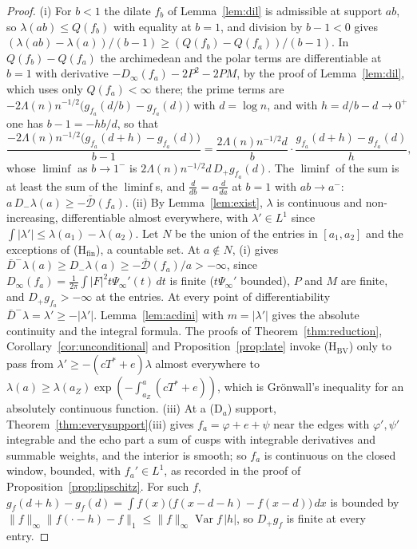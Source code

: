 \documentclass[11pt]{article}
\theoremstyle{definition}
\theoremstyle{remark}
\newcommand{\Tst}{T^{*}}
\newcommand{\Dm}{D_{-}}
\begin{document}
\begin{proof}
(i) For $b<1$ the dilate $f_b$ of Lemma~\ref{lem:dil} is admissible at support $ab$, so $\lambda(ab)\le Q(f_b)$ with equality at $b=1$, and division by $b-1<0$ gives $(\lambda(ab)-\lambda(a))/(b-1)\ge(Q(f_b)-Q(f_a))/(b-1)$. In $Q(f_b)-Q(f_a)$ the archimedean and the polar terms are differentiable at $b=1$ with derivative $-D_\infty(f_a)-2P^2-2PM$, by the proof of Lemma~\ref{lem:dil}, which uses only $Q(f_a)<\infty$ there; the prime terms are $-2\Lambda(n)n^{-1/2}\big(g_{f_a}(d/b)-g_{f_a}(d)\big)$ with $d=\log n$, and with $h=d/b-d\to0^+$ one has $b-1=-hb/d$, so that
\[
\frac{-2\Lambda(n)n^{-1/2}\big(g_{f_a}(d+h)-g_{f_a}(d)\big)}{b-1}=\frac{2\Lambda(n)n^{-1/2}d}{b}\cdot\frac{g_{f_a}(d+h)-g_{f_a}(d)}{h},
\]
whose $\liminf$ as $b\to1^-$ is $2\Lambda(n)n^{-1/2}d\,D_+g_{f_a}(d)$. The $\liminf$ of the sum is at least the sum of the $\liminf$s, and $\frac d{db}=a\frac d{da}$ at $b=1$ with $ab\to a^-$: $a\,\Dm\lambda(a)\ge-\bar{\mathcal D}(f_a)$. (ii) By Lemma~\ref{lem:exist}, $\lambda$ is continuous and non-increasing, differentiable almost everywhere, with $\lambda'\in L^1$ since $\int|\lambda'|\le\lambda(a_1)-\lambda(a_2)$. Let $N$ be the union of the entries in $[a_1,a_2]$ and the exceptions of (H$_{\mathrm{fin}}$), a countable set. At $a\notin N$, (i) gives $\bar D^-\lambda(a)\ge\Dm\lambda(a)\ge-\bar{\mathcal D}(f_a)/a>-\infty$, since $D_\infty(f_a)=\frac1{2\pi}\int|F|^2t\Psi_\infty'(t)\,dt$ is finite ($t\Psi_\infty'$ bounded), $P$ and $M$ are finite, and $D_+g_{f_a}>-\infty$ at the entries. At every point of differentiability $\bar D^-\lambda=\lambda'\ge-|\lambda'|$. Lemma~\ref{lem:acdini} with $m=|\lambda'|$ gives the absolute continuity and the integral formula. The proofs of Theorem~\ref{thm:reduction}, Corollary~\ref{cor:unconditional} and Proposition~\ref{prop:late} invoke (H$_{\mathrm{BV}}$) only to pass from $\lambda'\ge-(c\Tst+e)\lambda$ almost everywhere to $\lambda(a)\ge\lambda(a_Z)\exp(-\int_{a_Z}^a(c\Tst+e))$, which is Gr\"onwall's inequality for an absolutely continuous function. (iii) At a (D$_a$) support, Theorem~\ref{thm:everysupport}(iii) gives $f_a=\varphi+e+\psi$ near the edges with $\varphi',\psi'$ integrable and the echo part a sum of cusps with integrable derivatives and summable weights, and the interior is smooth; so $f_a$ is continuous on the closed window, bounded, with $f_a'\in L^1$, as recorded in the proof of Proposition~\ref{prop:lipschitz}. For such $f$, $g_f(d+h)-g_f(d)=\int f(x)\big(f(x-d-h)-f(x-d)\big)\,dx$ is bounded by $\|f\|_\infty\|f(\cdot-h)-f\|_1\le\|f\|_\infty\operatorname{Var}f\,|h|$, so $D_+g_f$ is finite at every entry.
\end{proof}
\end{document}
